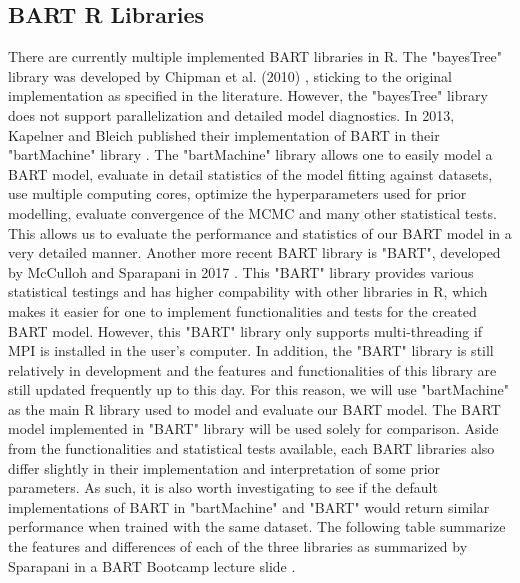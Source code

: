\documentclass{usiinftr}
\begin{document}
\subsection{BART R Libraries}
There are currently multiple implemented BART libraries in R. The "bayesTree" library was developed by Chipman et al. (2010) \cite{7}, sticking to the original implementation as specified in the literature. However, the "bayesTree" library does not support parallelization and detailed model diagnostics. In 2013, Kapelner and Bleich published their implementation of BART in their "bartMachine" library \cite{14}. The "bartMachine" library allows one to easily model a BART model, evaluate in detail statistics of the model fitting against datasets, use multiple computing cores, optimize the hyperparameters used for prior modelling, evaluate convergence of the MCMC and many other statistical tests. This allows us to evaluate the performance and statistics of our BART model in a very detailed manner. Another more recent BART library is "BART", developed by McCulloh and Sparapani in 2017 \cite{18}. This "BART" library provides various statistical testings and has higher compability with other libraries in R, which makes it easier for one to implement functionalities and tests for the created BART model. However, this "BART" library only supports multi-threading if MPI is installed in the user's computer. In addition, the "BART" library is still relatively in development and the features and functionalities of this library are still updated frequently up to this day. For this reason, we will use "bartMachine" as the main R library used to model and evaluate our BART model. The BART model implemented in "BART" library will be used solely for comparison. Aside from the functionalities and statistical tests available, each BART libraries also differ slightly in their implementation and interpretation of some prior parameters. As such, it is also worth investigating to see if the default implementations of BART in "bartMachine" and "BART" would return similar performance when trained with the same dataset. The following table summarize the features and differences of each of the three libraries as summarized by Sparapani in a BART Bootcamp lecture slide \cite{18}.
\end{document}
